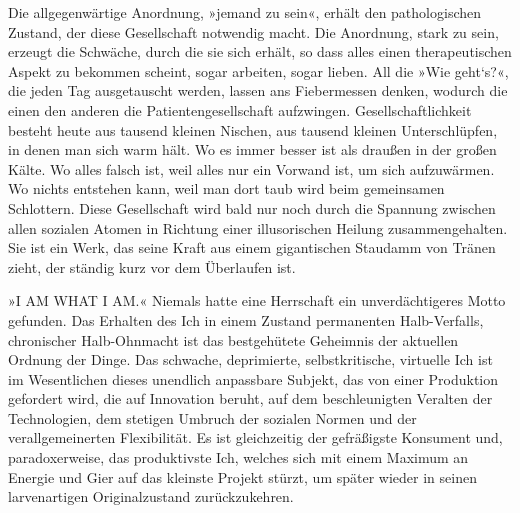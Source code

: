 Die allgegenwärtige Anordnung, »jemand zu sein«, erhält den
pathologischen Zustand, der diese Gesellschaft notwendig macht. Die
Anordnung, stark zu sein, erzeugt die Schwäche, durch die sie sich
erhält, so dass alles einen therapeutischen Aspekt zu bekommen
scheint, sogar arbeiten, sogar lieben. All die »Wie geht‘s?«, die
jeden Tag ausgetauscht werden, lassen ans Fiebermessen denken,
wodurch die einen den anderen die Patientengesellschaft aufzwingen.
Gesellschaftlichkeit besteht heute aus tausend kleinen Nischen, aus
tausend kleinen Unterschlüpfen, in denen man sich warm hält. Wo es
immer besser ist als draußen in der großen Kälte. Wo alles falsch
ist, weil alles nur ein Vorwand ist, um sich aufzuwärmen. Wo nichts
entstehen kann, weil man dort taub wird beim gemeinsamen
Schlottern. Diese Gesellschaft wird bald nur noch durch die
Spannung zwischen allen sozialen Atomen in Richtung einer
illusorischen Heilung zusammengehalten. Sie ist ein Werk, das seine
Kraft aus einem gigantischen Staudamm von Tränen zieht, der ständig
kurz vor dem Überlaufen ist.
\extrapar{}

»I AM WHAT I AM.« Niemals hatte eine Herrschaft ein
unverdächtigeres Motto gefunden. Das Erhalten des Ich in einem
Zustand permanenten Halb-Verfalls, chronischer Halb-Ohnmacht ist
das bestgehütete Geheimnis der aktuellen Ordnung der Dinge. Das
schwache, deprimierte, selbstkritische, virtuelle Ich ist im
Wesentlichen dieses unendlich anpassbare Subjekt, das von einer
Produktion gefordert wird, die auf Innovation beruht, auf dem
beschleunigten Veralten der Technologien, dem stetigen Umbruch der
sozialen Normen und der verallgemeinerten Flexibilität. Es ist
gleichzeitig der gefräßigste Konsument und, paradoxerweise, das
produktivste Ich, welches sich mit einem Maximum an Energie und
Gier auf das kleinste Projekt stürzt, um später wieder in seinen
larvenartigen Originalzustand zurückzukehren.
\extrapar{}

